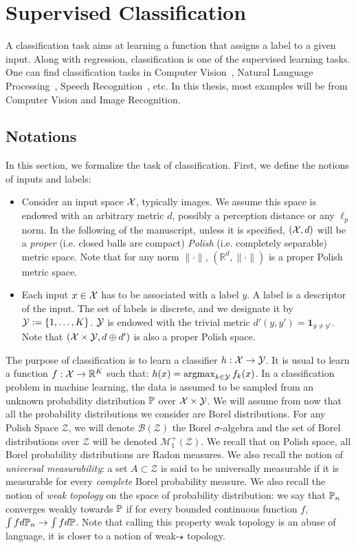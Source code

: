 \section{Supervised Classification}
A classification task aims at learning a function that assigns a label to a given input. Along with regression, classification is one of the  supervised learning tasks. One can find classification tasks in Computer Vision~\citep{lecun-mnisthandwrittendigit-2010,cifar-10,imagenet_cvpr09}, Natural Language Processing~\citep{vaswani2017attention}, Speech Recognition~\citep{dong2018speech}, etc. In this thesis, most examples will be from Computer Vision and Image Recognition. 
\subsection{Notations}
In this section, we formalize the task of classification. First, we define the notions of inputs and labels:
\begin{itemize}
    \item Consider an input space $\mathcal{X}$, typically images. We assume this space is endowed with an arbitrary metric $d$, possibly a perception distance or any $\ell_p$ norm. In the following of the manuscript, unless it is specified, $(\mathcal{X},d)$ will be a \textit{proper} (i.e. closed balls are compact) \textit{Polish} (i.e. completely separable) metric space. Note that for any norm $\lVert\cdot\rVert$,  $(\mathbb{R}^d,\lVert\cdot\rVert)$ is a proper Polish metric space.
    \item Each input $x\in \mathcal{X}$ has to be associated with a label $y$. A label is a descriptor of the input. The set of labels is discrete, and we designate it by $\mathcal{Y}:=\{1,\dots,K\}$. $\mathcal{Y}$ is endowed with the trivial metric  $d'(y,y') = \mathbf{1}_{y\neq y'}$. Note that $(\mathcal{X}\times\mathcal{Y},d\oplus d')$ is also a proper Polish space.
\end{itemize}

The purpose of classification is to learn a classifier $h:\mathcal{X}\to\mathcal{Y}$. It is usual to learn a function $f:\mathcal{X}\to\mathbb{R}^K$ such that: $h(x) = \operatorname*{argmax}_{k\in\mathcal{Y}}f_k(x)$. In a classification problem in machine learning, the data is assumed to be sampled from an unknown probability distribution $\mathbb{P}$ over $\mathcal{X}\times\mathcal{Y}$. We will assume from now that all the probability distributions we consider are Borel distributions. For any Polish Space $\mathcal{Z}$, we will denote $\mathcal{B}(\mathcal{Z})$ the Borel $\sigma$-algebra and the set of Borel distributions over $\mathcal{Z}$  will be denoted $\mathcal{M}_1^+(\mathcal{Z})$. We recall that on Polish space, all Borel probability distributions are Radon measures. We also recall the notion of \textit{universal measurability}: a set $A\subset \mathcal{Z}$ is said to be universally measurable if it is measurable for every \textit{complete} Borel probability measure. We also recall the notion of \emph{weak topology} on the space of probability distribution: we say that $\mathbb{P}_n$ converges weakly towards $\mathbb{P}$ if for every bounded continuous function $f$, $\int fd\mathbb{P}_n\to\int f d\mathbb{P}$. Note that calling this property weak topology is an abuse of language, it is closer to a notion of weak-$\star$ topology. 

